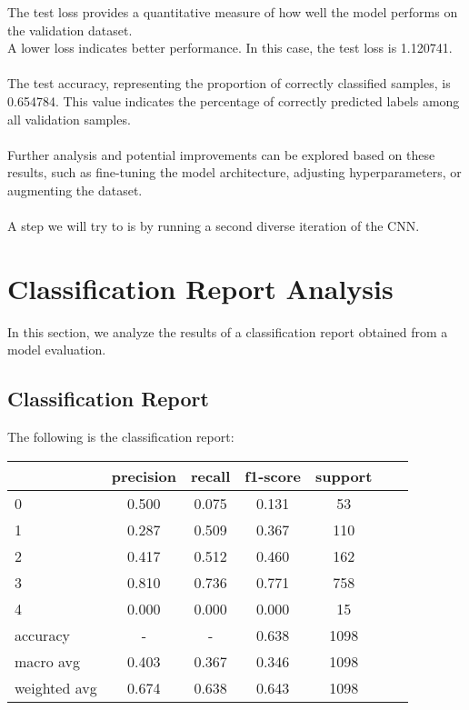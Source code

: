 \documentclass{article}
\begin{document}
The test loss provides a quantitative measure of how well the model performs on the validation dataset.
\\
A lower loss indicates better performance. In this case, the test loss is 1.120741.
\\
\\
The test accuracy, representing the proportion of correctly classified samples, is 0.654784. This value indicates the percentage of correctly predicted labels among all validation samples.
\\
\\
Further analysis and potential improvements can be explored based on these results, such as fine-tuning the model architecture, adjusting hyperparameters, or augmenting the dataset.
\\
\\
A step we will try to is by running a second diverse iteration of the CNN.

\section{Classification Report Analysis}

In this section, we analyze the results of a classification report obtained from a model evaluation.

\subsection{Classification Report}

The following is the classification report:
\\
\begin{center}
\centering
\begin{tabular}{lcccccc}
\hline
& precision & recall & f1-score & support \\
\hline
0 & 0.500 & 0.075 & 0.131 & 53 \\
1 & 0.287 & 0.509 & 0.367 & 110 \\
2 & 0.417 & 0.512 & 0.460 & 162 \\
3 & 0.810 & 0.736 & 0.771 & 758 \\
4 & 0.000 & 0.000 & 0.000 & 15 \\
\hline
accuracy & - & - & 0.638 & 1098 \\
macro avg & 0.403 & 0.367 & 0.346 & 1098 \\
weighted avg & 0.674 & 0.638 & 0.643 & 1098 \\
\hline
\end{tabular}
\end{center}
\end{document}
